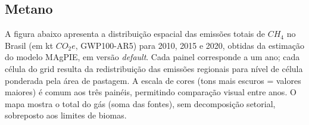\documentclass[
]{article}
\begin{document}
\subsection{Metano}\label{metano}

A figura abaixo apresenta a distribuição espacial das emissões totais de
\(CH_4\) no Brasil (em kt \(CO_2e\), GWP100-AR5) para 2010, 2015 e 2020,
obtidas da estimação do modelo MAgPIE, em versão \emph{default}. Cada
painel corresponde a um ano; cada célula do grid resulta da
redistribuição das emissões regionais para nível de célula ponderada
pela área de pastagem. A escala de cores (tons mais escuros = valores
maiores) é comum aos três painéis, permitindo comparação visual entre
anos. O mapa mostra o total do gás (soma das fontes), sem decomposição
setorial, sobreposto aos limites de biomas.
\end{document}
